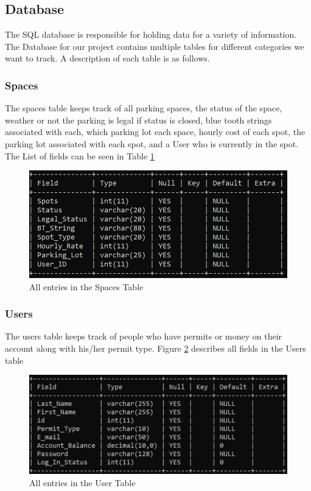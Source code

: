 \documentclass{article}
\begin{document}
\subsection{Database}
The SQL database is responsible for holding data for a variety of information. The Database for our project contains multiple tables for different categories we want to track. A description of each table is as follows.
\subsubsection{\textbf{Spaces}} The spaces table keeps track of all parking spaces, the status of the space, weather or not the parking is legal if status is closed, blue tooth strings associated with each, which parking lot each space, hourly cost of each spot, the parking lot associated with each spot, and a User who is currently in the spot. The List of fields can be seen in Table \ref{spaces} 
\begin{figure}[H]
\center
\includegraphics[scale=1]{spacesTable}
\caption{All entries in the Spaces Table}
\label{spaces}
\end{figure}
\subsubsection{\textbf{Users}} The users table keeps track of people who have permits or money on their account along with his/her permit type. Figure \ref{users} describes all fields in the Users table
\begin{figure}[H]
\center
\includegraphics[scale=1]{usersTable}
\caption{All entries in the User Table}
\label{users}
\end{figure}
\end{document}
